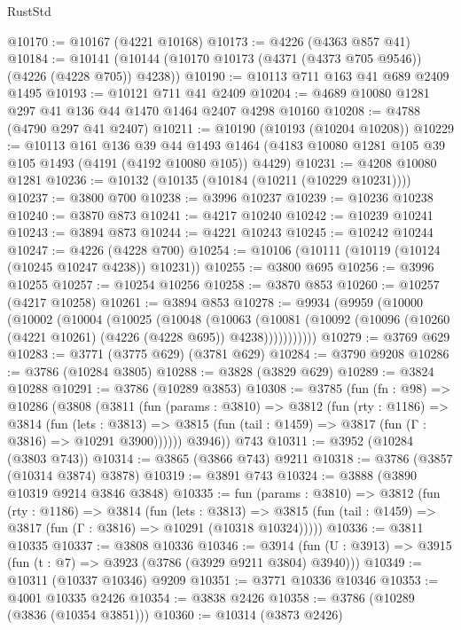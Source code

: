 \begin{lexlean}{RustStd}
\begin{coremodule}
@10170 := @10167 (@4221 @10168)
@10173 := @4226 (@4363 @857 @41)
@10184 := @10141 (@10144 (@10170 @10173 (@4371 (@4373 @705 @9546)) (@4226 (@4228 @705)) @4238))
@10190 := @10113 @711 @163 @41 @689 @2409 @1495
@10193 := @10121 @711 @41 @2409
@10204 := @4689 @10080 @1281 @297 @41 @136 @44 @1470 @1464 @2407 @4298 @10160
@10208 := @4788 (@4790 @297 @41 @2407)
@10211 := @10190 (@10193 (@10204 @10208))
@10229 := @10113
    @161
    @136
    @39
    @44
    @1493
    @1464
    (@4183 @10080 @1281 @105 @39 @105 @1493 (@4191 (@4192 @10080 @105)) @4429)
@10231 := @4208 @10080 @1281
@10236 := @10132 (@10135 (@10184 (@10211 (@10229 @10231))))
@10237 := @3800 @700
@10238 := @3996 @10237
@10239 := @10236 @10238
@10240 := @3870 @873
@10241 := @4217 @10240
@10242 := @10239 @10241
@10243 := @3894 @873
@10244 := @4221 @10243
@10245 := @10242 @10244
@10247 := @4226 (@4228 @700)
@10254 := @10106 (@10111 (@10119 (@10124 (@10245 @10247 @4238)) @10231))
@10255 := @3800 @695
@10256 := @3996 @10255
@10257 := @10254 @10256
@10258 := @3870 @853
@10260 := @10257 (@4217 @10258)
@10261 := @3894 @853
@10278 := @9934
    (@9959
      (@10000
        (@10002
          (@10004
            (@10025
              (@10048
                (@10063
                  (@10081
                    (@10092 (@10096 (@10260 (@4221 @10261) (@4226 (@4228 @695)) @4238)))))))))))
@10279 := @3769 @629
@10283 := @3771 (@3775 @629) (@3781 @629)
@10284 := @3790 @9208
@10286 := @3786 (@10284 @3805)
@10288 := @3828 (@3829 @629)
@10289 := @3824 @10288
@10291 := @3786 (@10289 @3853)
@10308 := @3785
    (fun (fn : @98) =>
    @10286
      (@3808
        (@3811
          (fun (params : @3810) =>
          @3812
            (fun (rty : @1186) =>
            @3814
              (fun (lets : @3813) =>
              @3815 (fun (tail : @1459) => @3817 (fun (Γ : @3816) => @10291 @3900))))))
        @3946))
    @743
@10311 := @3952 (@10284 (@3803 @743))
@10314 := @3865 (@3866 @743) @9211
@10318 := @3786 (@3857 (@10314 @3874) @3878)
@10319 := @3891 @743
@10324 := @3888 (@3890 @10319 @9214 @3846 @3848)
@10335 := fun (params : @3810) =>
  @3812
    (fun (rty : @1186) =>
    @3814
      (fun (lets : @3813) =>
      @3815 (fun (tail : @1459) => @3817 (fun (Γ : @3816) => @10291 (@10318 @10324)))))
@10336 := @3811 @10335
@10337 := @3808 @10336
@10346 := @3914 (fun (U : @3913) => @3915 (fun (t : @7) => @3923 (@3786 (@3929 @9211 @3804) @3940)))
@10349 := @10311 (@10337 @10346) @9209
@10351 := @3771 @10336 @10346
@10353 := @4001 @10335 @2426
@10354 := @3838 @2426
@10358 := @3786 (@10289 (@3836 (@10354 @3851)))
@10360 := @10314 (@3873 @2426)

\end{coremodule}
\end{lexlean}
